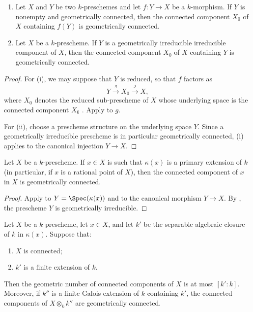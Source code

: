 \begin{corollary}[4.5.13.1]
\label{IV.4.5.13.1}
\begin{enumerate}
\item[\rm(i)]
\label{IV.4.5.13.1.i}
Let $X$ and $Y$ be two $k$-preschemes and let $f:Y\to X$ be a
$k$-morphism.
If $Y$ is nonempty and geometrically connected, then the connected
component $X_0$ of $X$ containing $f(Y)$ is geometrically connected.

\item[\rm(ii)]
\label{IV.4.5.13.1.ii}
Let $X$ be a $k$-prescheme.
If $Y$ is a geometrically irreducible irreducible component of $X$,
then the connected component $X_0$ of $X$ containing $Y$ is
geometrically connected.
\end{enumerate}
\end{corollary}

\begin{proof}
For (i), we may suppose that $Y$ is reduced, so that $f$ factors as
\[
Y\xrightarrow{g}X_0\xrightarrow{j}X,
\]
where $X_0$ denotes the reduced sub-prescheme of $X$ whose underlying
space is the connected component $X_0$ .
Apply  to $g$.

For (ii), choose a prescheme structure on the underlying space $Y$.
Since a geometrically irreducible prescheme is in particular
geometrically connected, (i) applies to the canonical injection
$Y\to X$.
\end{proof}


\begin{corollary}[4.5.14]
\label{IV.4.5.14}
Let $X$ be a $k$-prescheme.
If $x\in X$ is such that $\kappa(x)$ is a primary extension of $k$
(in particular, if $x$ is a rational point of $X$), then the
connected component of $x$ in $X$ is geometrically connected.
\end{corollary}

\begin{proof}
Apply  to
$Y=\Spec(\kappa(x))$ and to the canonical morphism $Y\to X$.
By , the prescheme $Y$ is geometrically irreducible.
\end{proof}

\begin{proposition}[4.5.15]
\label{IV.4.5.15}
Let $X$ be a $k$-prescheme, let $x\in X$, and let $k'$ be the
separable algebraic closure of $k$ in $\kappa(x)$.
Suppose that:
\begin{enumerate}
\item[\rm(i)]
\label{IV.4.5.15.i}
$X$ is connected;

\item[\rm(ii)]
\label{IV.4.5.15.ii}
$k'$ is a finite extension of $k$.
\end{enumerate}
Then the geometric number of connected components of $X$ is at most
$[k':k]$.
Moreover, if $k''$ is a finite Galois extension of $k$ containing
$k'$, the connected components of $X\otimes_k k''$ are geometrically
connected.
\end{proposition}

